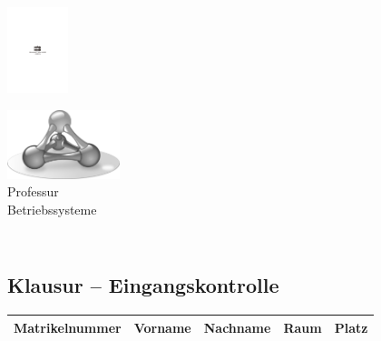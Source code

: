 \documentclass[12pt]{article}
\begin{document}
  \begin{minipage}[c]{4cm}
  \includegraphics[height=2.5cm,width=\textwidth,keepaspectratio]{../lib/TUC}
  \end{minipage}%
  \hfill%
  \begin{minipage}[c]{4cm}
  \includegraphics[height=2cm,width=\textwidth,keepaspectratio]{../lib/logo-sw} \\
  {\scriptsize{Professur\\[-2.5mm] Betriebssysteme}\vspace{1mm}}
  \end{minipage}


\begin{centering}
\section*{\coursename \xspace \coursesemester \\ Klausur -- Eingangskontrolle}
\end{centering}


\begin{tabularx}{\textwidth}{llllr}
\toprule
 Matrikelnummer & Vorname & Nachname & Raum & Platz \\
\midrule

\bottomrule
\end{tabularx}
\end{document}
